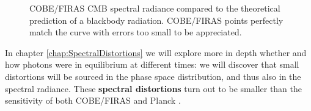 \begin{figure}
\caption{COBE/FIRAS \cite{COBE1996} CMB spectral radiance compared to the theoretical prediction of a blackbody radiation. COBE/FIRAS points perfectly match the curve with errors too small to be appreciated.}
\label{fig:COBE/FIRAS_spectrum}
\end{figure}

In chapter \ref{chap:SpectralDistortions} we will explore more in depth whether and how photons were in equilibrium at different times: we will discover that small distortions will be sourced in the phase space distribution, and thus also in the spectral radiance. These \textbf{spectral distortions} turn out to be smaller than the sensitivity of both COBE/FIRAS and Planck \cite{planck2018results}. 

